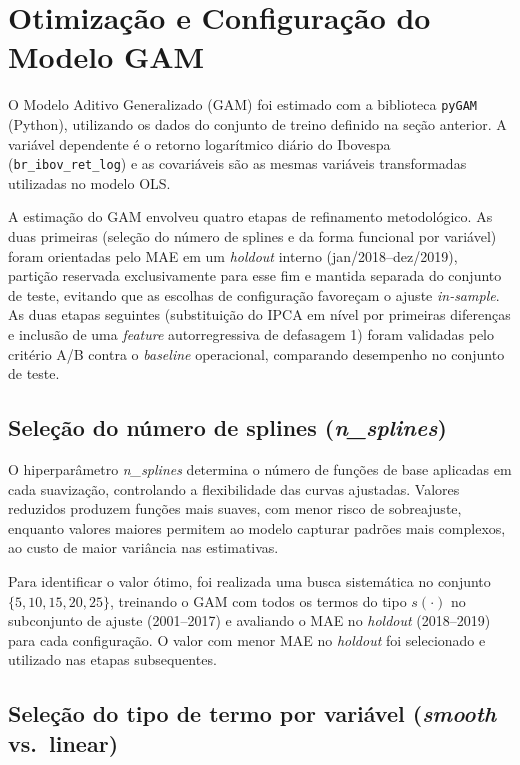\documentclass[	12pt, Times, openright, oneside, a4paper, english, brazil]{abntex2}
\begin{document}
\section{Otimização e Configuração do Modelo GAM}\label{sec:gam_otimizacao}

O Modelo Aditivo Generalizado (GAM) foi estimado com a biblioteca \texttt{pyGAM} (Python), utilizando os dados do conjunto de treino definido na seção anterior. A variável dependente é o retorno logarítmico diário do Ibovespa (\texttt{br\_ibov\_ret\_log}) e as covariáveis são as mesmas variáveis transformadas utilizadas no modelo OLS.

A estimação do GAM envolveu quatro etapas de refinamento metodológico. As duas primeiras (seleção do número de splines e da forma funcional por variável) foram orientadas pelo MAE em um \textit{holdout} interno (jan/2018--dez/2019), partição reservada exclusivamente para esse fim e mantida separada do conjunto de teste, evitando que as escolhas de configuração favoreçam o ajuste \textit{in-sample}. As duas etapas seguintes (substituição do IPCA em nível por primeiras diferenças e inclusão de uma \textit{feature} autorregressiva de defasagem 1) foram validadas pelo critério A/B contra o \textit{baseline} operacional, comparando desempenho no conjunto de teste.

\subsection{Seleção do número de splines (\textit{n\_splines})}

O hiperparâmetro \textit{n\_splines} determina o número de funções de base aplicadas em cada suavização, controlando a flexibilidade das curvas ajustadas. Valores reduzidos produzem funções mais suaves, com menor risco de sobreajuste, enquanto valores maiores permitem ao modelo capturar padrões mais complexos, ao custo de maior variância nas estimativas.

\begin{sloppypar}
Para identificar o valor ótimo, foi realizada uma busca sistemática no conjunto $\{5, 10, 15, 20, 25\}$, treinando o GAM com todos os termos do tipo $s(\cdot)$ no subconjunto de ajuste (2001--2017) e avaliando o MAE no \textit{holdout} (2018--2019) para cada configuração. O valor com menor MAE no \textit{holdout} foi selecionado e utilizado nas etapas subsequentes.
\end{sloppypar}

\subsection{Seleção do tipo de termo por variável (\textit{smooth} vs.\ linear)}
\end{document}
